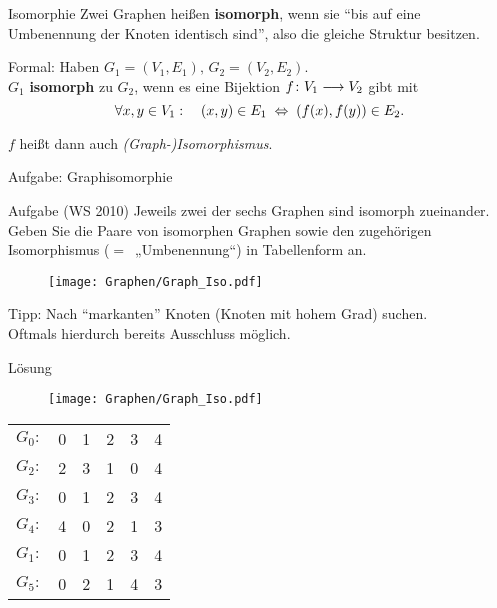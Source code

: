 
\begin{frame}{Isomorphie}
	Zwei Graphen heißen \textbf{isomorph}, wenn sie \enquote{bis auf eine Umbenennung der Knoten identisch sind}, also die gleiche Struktur besitzen.\\
	
	\pause
	\medskip
	
	Formal: Haben $G_1 = (V_1, E_1), \, G_2 = (V_2, E_2)$. \\ \smallskip
	$G_1$ \textbf{isomorph} zu $G_2$, wenn es eine Bijektion $f \colon V_1 \longrightarrow V_2$ gibt mit \[\forall x,y \in V_1: \quad (x,y) \in E_1 \gdw \tuple{f(x),f(y)} \in E_2. \]
	
	$f$ heißt dann auch \emph{(Graph-)Isomorphismus}.
	
\end{frame}

\begin{frame}{Aufgabe: Graphisomorphie}
	\begin{block}{Aufgabe (WS 2010)}
		Jeweils zwei der sechs Graphen sind isomorph zueinander. Geben Sie die Paare von isomorphen Graphen sowie den zugehörigen Isomorphismus ($=$~„Umbenennung“) in Tabellenform an.
		\begin{figure}[H]
			\centering
			\texttt{[image: Graphen/Graph\_Iso.pdf]}
		\end{figure}
	\end{block}
	Tipp: Nach \enquote{markanten} Knoten (Knoten mit hohem Grad) suchen.\\
	Oftmals hierdurch bereits Ausschluss möglich.
\end{frame}

\begin{frame}{Lösung}
	\begin{figure}[H]
		\centering
		\texttt{[image: Graphen/Graph\_Iso.pdf]}
	\end{figure}
	\begin{table}[H]
		\centering
		\begin{tabular}{c|c|c|c|c|c}
			$G_0: $ & 0 & 1 & 2 & 3 & 4 \\
			$G_2: $ & 2 & 3 & 1 & 0 & 4 \\[1em]
			$G_3: $ & 0 & 1 & 2 & 3 & 4 \\
			$G_4: $ & 4 & 0 & 2 & 1 & 3 \\[1em]
			$G_1: $ & 0 & 1 & 2 & 3 & 4 \\
			$G_5: $ & 0 & 2 & 1 & 4 & 3 \\
		\end{tabular}
	\end{table}
\end{frame}


